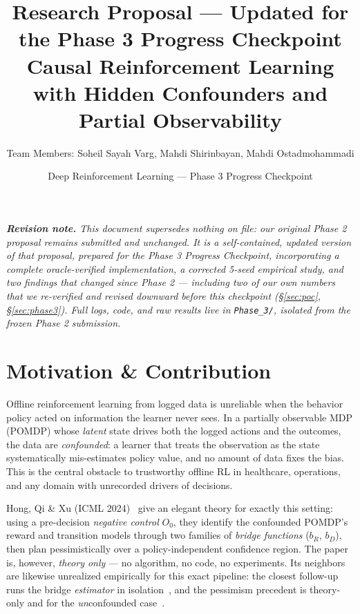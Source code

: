 \documentclass[11pt]{article}
\title{\textbf{Research Proposal --- Updated for the Phase 3 Progress Checkpoint}\\
Causal Reinforcement Learning with Hidden Confounders and Partial Observability}
\author{Team Members: Soheil Sayah Varg, Mahdi Shirinbayan, Mahdi Ostadmohammadi}
\date{Deep Reinforcement Learning --- Phase 3 Progress Checkpoint}
\begin{document}
\maketitle

\begin{center}
\begin{minipage}{0.92\textwidth}
\small\itshape
\noindent\textbf{Revision note.} This document supersedes nothing on file: our original
Phase 2 proposal remains submitted and unchanged. It is a self-contained, updated version
of that proposal, prepared for the Phase 3 Progress Checkpoint, incorporating a
complete oracle-verified implementation, a corrected 5-seed empirical study, and two
findings that changed since Phase 2 --- including two of our own numbers that we
re-verified and revised downward before this checkpoint (\S\ref{sec:poc},
\S\ref{sec:phase3}). Full logs,
code, and raw results live in \texttt{Phase\_3/}, isolated from the frozen Phase 2
submission.
\end{minipage}
\end{center}

\vspace{4pt}

\section{Motivation \& Contribution}

Offline reinforcement learning from logged data is unreliable when the behavior policy
acted on information the learner never sees. In a partially observable MDP (POMDP) whose
\emph{latent} state drives both the logged actions and the outcomes, the data are
\emph{confounded}: a learner that treats the observation as the state systematically
mis-estimates policy value, and no amount of data fixes the bias. This is the central
obstacle to trustworthy offline RL in healthcare, operations, and any domain with
unrecorded drivers of decisions.

Hong, Qi \& Xu (ICML 2024)~\cite{hong2024} give an elegant theory for exactly this
setting: using a pre-decision \emph{negative control} $O_0$, they identify the confounded
POMDP's reward and transition models through two families of \emph{bridge functions}
($b_R$, $b_D$), then plan pessimistically over a policy-independent confidence region. The
paper is, however, \emph{theory only} --- no algorithm, no code, no experiments. Its
neighbors are likewise unrealized empirically for this exact pipeline: the closest
follow-up runs the bridge \emph{estimator} in isolation~\cite{venkatesh2026}, and the
pessimism precedent is theory-only and for the \emph{un}confounded case~\cite{guo2022}.
\end{document}
